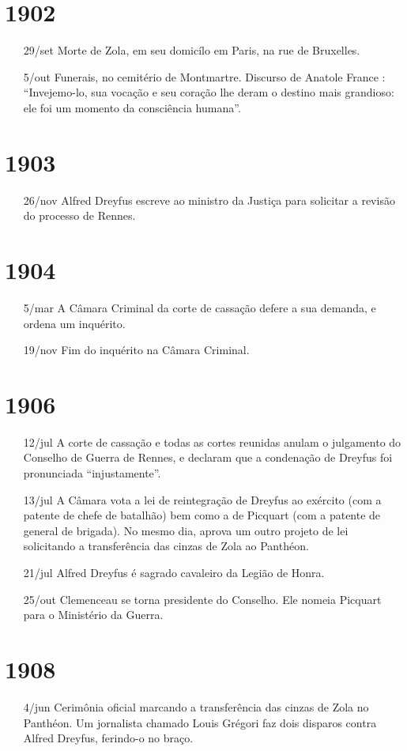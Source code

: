 \section{1902}
\begin{itemize}
\setlength\itemsep{-1mm}
\item[29/set] Morte de Zola, em seu domicílo em Paris, na rue de Bruxelles.

\item[5/out] Funerais, no cemitério de Montmartre. Discurso de Anatole France :
``Invejemo-lo, sua vocação e seu coração lhe deram o destino mais grandioso:
ele foi um momento da consciência humana''.
\end{itemize}

\section{1903}
\begin{itemize}
\setlength\itemsep{-1mm}
\item[26/nov] Alfred Dreyfus escreve ao ministro da Justiça para solicitar a
revisão do processo de Rennes.
\end{itemize}

\pagebreak
\section{1904}
\begin{itemize}
\setlength\itemsep{-1mm}
\item[5/mar] A Câmara Criminal da corte de cassação defere a sua demanda, e
ordena um inquérito.

\item[19/nov] Fim do inquérito na Câmara Criminal.
\end{itemize}

\section{1906}
\begin{itemize}
\setlength\itemsep{-1mm}
\item[12/jul] A corte de cassação e todas as cortes reunidas anulam o
julgamento do Conselho de Guerra de Rennes, e declaram que a condenação de
Dreyfus foi pronunciada ``injustamente''.

\item[13/jul] A Câmara vota a lei de reintegração de Dreyfus ao exército (com a
patente de chefe de batalhão) bem como a de Picquart (com a patente de general
de brigada). No mesmo dia, aprova um outro projeto de lei solicitando a
transferência das cinzas de Zola ao Panthéon. 

\item[21/jul] Alfred Dreyfus é sagrado cavaleiro da Legião de Honra.

\item[25/out] Clemenceau se torna presidente do Conselho. Ele nomeia Picquart
para o Ministério da Guerra.
\end{itemize}

\section{1908}
\begin{itemize}
\setlength\itemsep{-1mm}
\item[4/jun] Cerimônia oficial marcando a transferência das cinzas de Zola no
Panthéon. Um jornalista chamado Louis Grégori faz dois disparos contra Alfred
Dreyfus, ferindo-o no braço.
\end{itemize}
